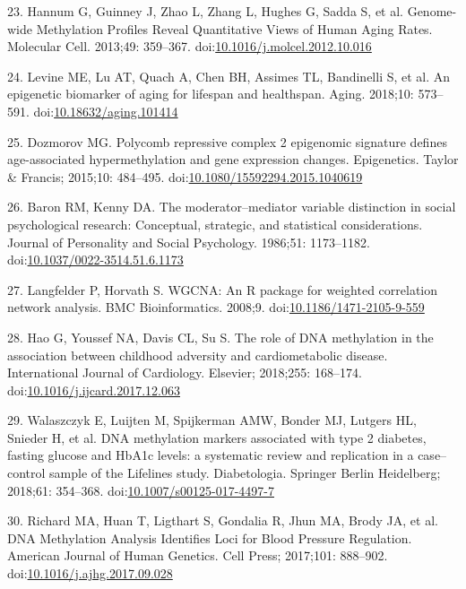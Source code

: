 \documentclass[]{article}
\theoremstyle{definition}
\theoremstyle{definition}
\theoremstyle{definition}
\theoremstyle{remark}
\begin{document}
23. Hannum G, Guinney J, Zhao L, Zhang L, Hughes G, Sadda S, et al.
Genome-wide Methylation Profiles Reveal Quantitative Views of Human
Aging Rates. Molecular Cell. 2013;49: 359--367.
doi:\href{http://dx.doi.org/10.1016/j.molcel.2012.10.016}{10.1016/j.molcel.2012.10.016}

24. Levine ME, Lu AT, Quach A, Chen BH, Assimes TL, Bandinelli S, et al.
An epigenetic biomarker of aging for lifespan and healthspan. Aging.
2018;10: 573--591.
doi:\href{http://dx.doi.org/10.18632/aging.101414}{10.18632/aging.101414}

25. Dozmorov MG. Polycomb repressive complex 2 epigenomic signature
defines age-associated hypermethylation and gene expression changes.
Epigenetics. Taylor \& Francis; 2015;10: 484--495.
doi:\href{http://dx.doi.org/10.1080/15592294.2015.1040619}{10.1080/15592294.2015.1040619}

26. Baron RM, Kenny DA. The moderator--mediator variable distinction in
social psychological research: Conceptual, strategic, and statistical
considerations. Journal of Personality and Social Psychology. 1986;51:
1173--1182.
doi:\href{http://dx.doi.org/10.1037/0022-3514.51.6.1173}{10.1037/0022-3514.51.6.1173}

27. Langfelder P, Horvath S. WGCNA: An R package for weighted
correlation network analysis. BMC Bioinformatics. 2008;9.
doi:\href{http://dx.doi.org/10.1186/1471-2105-9-559}{10.1186/1471-2105-9-559}

28. Hao G, Youssef NA, Davis CL, Su S. The role of DNA methylation in
the association between childhood adversity and cardiometabolic disease.
International Journal of Cardiology. Elsevier; 2018;255: 168--174.
doi:\href{http://dx.doi.org/10.1016/j.ijcard.2017.12.063}{10.1016/j.ijcard.2017.12.063}

29. Walaszczyk E, Luijten M, Spijkerman AMW, Bonder MJ, Lutgers HL,
Snieder H, et al. DNA methylation markers associated with type 2
diabetes, fasting glucose and HbA1c levels: a systematic review and
replication in a case--control sample of the Lifelines study.
Diabetologia. Springer Berlin Heidelberg; 2018;61: 354--368.
doi:\href{http://dx.doi.org/10.1007/s00125-017-4497-7}{10.1007/s00125-017-4497-7}

30. Richard MA, Huan T, Ligthart S, Gondalia R, Jhun MA, Brody JA, et
al. DNA Methylation Analysis Identifies Loci for Blood Pressure
Regulation. American Journal of Human Genetics. Cell Press; 2017;101:
888--902.
doi:\href{http://dx.doi.org/10.1016/j.ajhg.2017.09.028}{10.1016/j.ajhg.2017.09.028}
\end{document}
